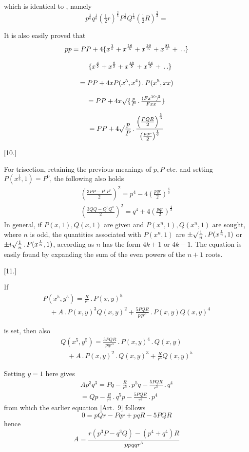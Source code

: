 which is identical to \GaussCircleArrow{}, namely
\[
p^{\frac16}q^{\frac16}(\tfrac12r)^{\frac26}
P^{\frac{1}{3}}
Q^{\frac{1}{3}}
(\tfrac12R)^{\frac23}=
\]

It is also easily proved that
\[
\begin{gathered}
pp=PP+4\{x^{\frac15}+x^{\frac{16}5}+x^{\frac{36}5}+x^{\frac{81}5}+\, .\,.\}
\\[8pt]\quad{}\{x^{\frac45}+x^{\frac95}+x^{\frac{49}5}+x^{\frac{64}5}+\, .\,.\}\\[8pt]
=PP+4xP(x^5,x^4)\, .\,P(x^5,xx)\\[8pt]
=PP+4x\surd\{\tfrac pP\, .\,\tfrac{(Fx^{10})^5}{Fxx}\}\\[8pt]
=PP+4\surd\frac pP\, .\,\frac{\left(\frac{PQR}{2}\right)^{\frac56}}{\left(\frac{pqr}{2}\right)^{\frac16}}
\end{gathered}
\]

\par\medskip{}\centerline{[10.]}\nobreak\smallskip
For trisection, retaining the previous meanings of \(p,P\) etc.
and setting \(P(x^{\frac13},1)=P^0\), the following also holds
\[
\begin{gathered}
\left(\frac{3PP-P^0P^0}{2}\right)^2=p^4-4\left(\frac{pqr}{2}\right)^{\frac43}\\[8pt]
\left(\frac{3QQ-Q^0Q^0}{2}\right)^2=q^4+4\left(\frac{pqr}{2}\right)^{\frac43}
\end{gathered}
\]
In general, if \(P(x,1),Q(x,1)\) are given and \(P(x^n,1),Q(x^n,1)\) are sought,
where \(n\) is odd, the quantities associated with \(P(x^n,1)\) are
\(\pm\surd\frac1n\, .\,P(x^{\frac1n},1)\)
or \(\pm i\surd\frac1n\, .\,P(x^{\frac1n},1)\), according as \(n\) has the form
\(4k+1\) or \(4k-1\).
The equation is easily found by expanding the sum of the even powers
of the \(n+1\) roots.

\par\medskip{}\centerline{[11.]}\nobreak\smallskip
If
\[
\begin{gathered}P(x^5,y^5)=\frac{R}{r^5}\, .\,P(x,y)^5
\\[8pt]\quad{}+A\, .\,P(x,y)^3Q(x,y)^2
+\frac{5PQR}{pqr^5}\, .\,P(x,y)Q(x,y)^4\end{gathered}
\]

is set, then also
\[
\begin{gathered}
Q(x^5,y^5)
=\frac{5PQR}{pqr^5}\, .\,P(x,y)^4\, .\,Q(x,y)\\[8pt]
\quad+A\, .\,P(x,y)^2\, .\,Q(x,y)^3
+\frac{R}{r^5}Q(x,y)^5
\end{gathered}
\]

Setting \(y=1\) here gives
\[
\begin{gathered}
Ap^3q^3=Pq-\frac{R}{r^5}\, .\,p^5q
-\frac{5PQR}{r^5}\, .\,q^4\\[8pt]
=Qp-\frac{R}{r^5}\, .\,q^5p
-\frac{5PQR}{r^5}\, .\,p^4
\end{gathered}
\]
from which the earlier equation [Art.\ 9] follows
\[
0=pQr-Pqr+pqR-5PQR
\]
hence
\[
A=\frac{r(p^3P-q^3Q)-(p^4+q^4)R}{ppqqr^5}
\]
\clearpage
\endgroup

